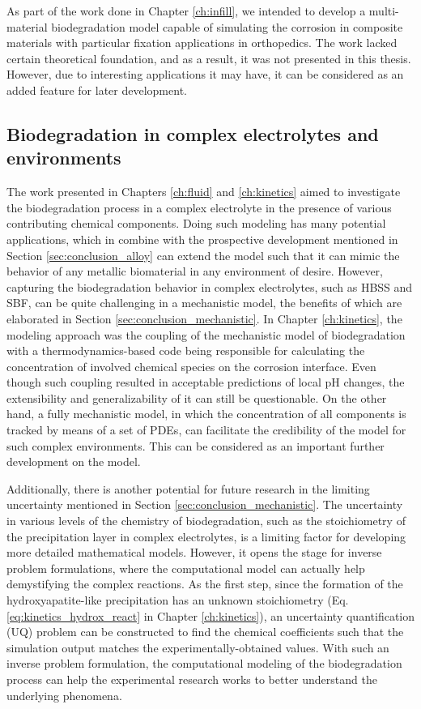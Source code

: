 As part of the work done in Chapter \ref{ch:infill}, we intended to develop a multi-material biodegradation model capable of simulating the corrosion in composite materials with particular fixation applications in orthopedics. The work lacked certain theoretical foundation, and as a result, it was not presented in this thesis. However, due to interesting applications it may have, it can be considered as an added feature for later development.

\subsection{Biodegradation in complex electrolytes and environments}

The work presented in Chapters \ref{ch:fluid} and \ref{ch:kinetics} aimed to investigate the biodegradation process in a complex electrolyte in the presence of various contributing chemical components. Doing such modeling has many potential applications, which in combine with the prospective development mentioned in Section \ref{sec:conclusion_alloy} can extend the model such that it can mimic the behavior of any metallic biomaterial in any environment of desire. However, capturing the biodegradation behavior in complex electrolytes, such as HBSS and SBF, can be quite challenging in a mechanistic model, the benefits of which are elaborated in Section \ref{sec:conclusion_mechanistic}. In Chapter \ref{ch:kinetics}, the modeling approach was the coupling of the mechanistic model of biodegradation with a thermodynamics-based code being responsible for calculating the concentration of involved chemical species on the corrosion interface. Even though such coupling resulted in acceptable predictions of local pH changes, the extensibility and generalizability of it can still be questionable. On the other hand, a fully mechanistic model, in which the concentration of all components is tracked by means of a set of PDEs, can facilitate the credibility of the model for such complex environments. This can be considered as an important further development on the model.

Additionally, there is another potential for future research in the limiting uncertainty mentioned in Section \ref{sec:conclusion_mechanistic}. The uncertainty in various levels of the chemistry of biodegradation, such as the stoichiometry of the precipitation layer in complex electrolytes, is a limiting factor for developing more detailed mathematical models. However, it opens the stage for inverse problem formulations, where the computational model can actually help demystifying the complex reactions. As the first step, since the formation of the hydroxyapatite-like precipitation has an unknown stoichiometry (Eq. \ref{eq:kinetics_hydrox_react} in Chapter \ref{ch:kinetics}), an uncertainty quantification (UQ) problem can be constructed to find the chemical coefficients such that the simulation output matches the experimentally-obtained values. With such an inverse problem formulation, the computational modeling of the biodegradation process can help the experimental research works to better understand the underlying phenomena.

